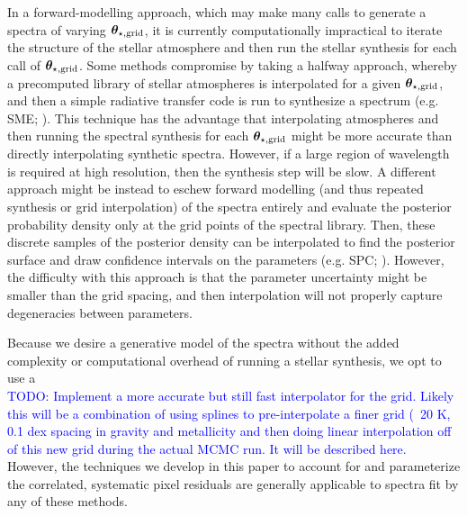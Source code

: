 \documentclass[preprint]{aastex} %
\newcommand{\vt}{ {\bm \theta}}
\newcommand{\vg}{\vt_{\star, {\rm grid}}}
\newcommand{\todo}[1]{ \textcolor{Blue}{\\TODO: #1}}
\begin{document}
In a forward-modelling approach, which may make many calls to generate a
spectra of varying $\vg$, it is currently computationally impractical to
iterate the structure of the stellar atmosphere and then run the stellar
synthesis for each call of $\vg$.  Some methods compromise by taking a halfway
approach, whereby a precomputed library of stellar atmospheres is interpolated
for a given $\vg$, and then a simple radiative transfer code is run to
synthesize a spectrum (e.g.  SME; \citealt{vp96}). This technique has the
advantage that interpolating atmospheres and then running the spectral
synthesis for each $\vg$ might be more accurate than directly interpolating
synthetic spectra. However, if a large region of wavelength is required at high
resolution, then the synthesis step will be slow.  A different approach might
be instead to eschew forward modelling (and thus repeated synthesis or grid
interpolation) of the spectra entirely and evaluate the posterior probability
density only at the grid points of the spectral library.  Then, these discrete
samples of the posterior density can be interpolated to find the posterior
surface and draw confidence intervals on the parameters (e.g. SPC;
\citealt{blj+12}). However, the difficulty with this approach is that the
parameter uncertainty might be smaller than the grid spacing, and then
interpolation will not properly capture degeneracies between parameters.

Because we desire a generative model of the spectra without the added
complexity or computational overhead of running a stellar synthesis, we opt to
use a \todo{Implement a more accurate but still fast interpolator for the grid.
Likely this will be a combination of using splines to pre-interpolate a finer
grid (~20 K, 0.1 dex spacing in gravity and metallicity and then doing linear
interpolation off of this new grid during the actual MCMC run. It will be described here.} However, the
techniques we develop in this paper to account for and parameterize the
correlated, systematic pixel residuals are generally applicable to spectra fit
by any of these methods.
\end{document}
